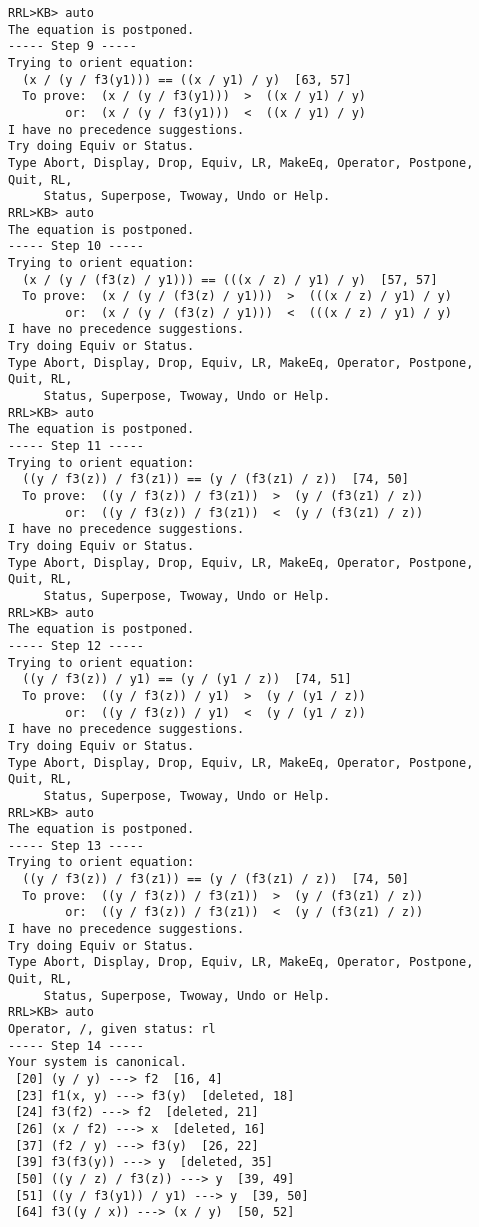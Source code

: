 \begin{verbatim}
RRL>KB> auto
The equation is postponed.
----- Step 9 -----
Trying to orient equation: 
  (x / (y / f3(y1))) == ((x / y1) / y)  [63, 57]
  To prove:  (x / (y / f3(y1)))  >  ((x / y1) / y)
        or:  (x / (y / f3(y1)))  <  ((x / y1) / y)
I have no precedence suggestions.  
Try doing Equiv or Status.
Type Abort, Display, Drop, Equiv, LR, MakeEq, Operator, Postpone, Quit, RL,
     Status, Superpose, Twoway, Undo or Help.
RRL>KB> auto
The equation is postponed.
----- Step 10 -----
Trying to orient equation: 
  (x / (y / (f3(z) / y1))) == (((x / z) / y1) / y)  [57, 57]
  To prove:  (x / (y / (f3(z) / y1)))  >  (((x / z) / y1) / y)
        or:  (x / (y / (f3(z) / y1)))  <  (((x / z) / y1) / y)
I have no precedence suggestions.  
Try doing Equiv or Status.
Type Abort, Display, Drop, Equiv, LR, MakeEq, Operator, Postpone, Quit, RL,
     Status, Superpose, Twoway, Undo or Help.
RRL>KB> auto
The equation is postponed.
----- Step 11 -----
Trying to orient equation: 
  ((y / f3(z)) / f3(z1)) == (y / (f3(z1) / z))  [74, 50]
  To prove:  ((y / f3(z)) / f3(z1))  >  (y / (f3(z1) / z))
        or:  ((y / f3(z)) / f3(z1))  <  (y / (f3(z1) / z))
I have no precedence suggestions.  
Try doing Equiv or Status.
Type Abort, Display, Drop, Equiv, LR, MakeEq, Operator, Postpone, Quit, RL,
     Status, Superpose, Twoway, Undo or Help.
RRL>KB> auto
The equation is postponed.
----- Step 12 -----
Trying to orient equation: 
  ((y / f3(z)) / y1) == (y / (y1 / z))  [74, 51]
  To prove:  ((y / f3(z)) / y1)  >  (y / (y1 / z))
        or:  ((y / f3(z)) / y1)  <  (y / (y1 / z))
I have no precedence suggestions.  
Try doing Equiv or Status.
Type Abort, Display, Drop, Equiv, LR, MakeEq, Operator, Postpone, Quit, RL,
     Status, Superpose, Twoway, Undo or Help.
RRL>KB> auto
The equation is postponed.
----- Step 13 -----
Trying to orient equation: 
  ((y / f3(z)) / f3(z1)) == (y / (f3(z1) / z))  [74, 50]
  To prove:  ((y / f3(z)) / f3(z1))  >  (y / (f3(z1) / z))
        or:  ((y / f3(z)) / f3(z1))  <  (y / (f3(z1) / z))
I have no precedence suggestions.  
Try doing Equiv or Status.
Type Abort, Display, Drop, Equiv, LR, MakeEq, Operator, Postpone, Quit, RL,
     Status, Superpose, Twoway, Undo or Help.
RRL>KB> auto
Operator, /, given status: rl
----- Step 14 -----
Your system is canonical.
 [20] (y / y) ---> f2  [16, 4]
 [23] f1(x, y) ---> f3(y)  [deleted, 18]
 [24] f3(f2) ---> f2  [deleted, 21]
 [26] (x / f2) ---> x  [deleted, 16]
 [37] (f2 / y) ---> f3(y)  [26, 22]
 [39] f3(f3(y)) ---> y  [deleted, 35]
 [50] ((y / z) / f3(z)) ---> y  [39, 49]
 [51] ((y / f3(y1)) / y1) ---> y  [39, 50]
 [64] f3((y / x)) ---> (x / y)  [50, 52]

\end{verbatim}
